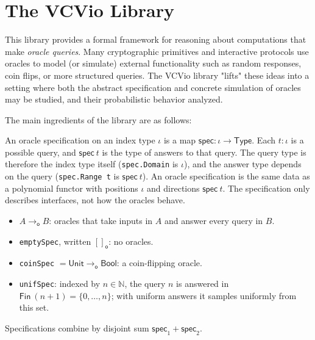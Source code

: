 \section{The VCVio Library}\label{sec:vcvio}

This library provides a formal framework for reasoning about computations that make \emph{oracle
queries}. Many cryptographic primitives and interactive protocols use oracles to model (or simulate)
external functionality such as random responses, coin flips, or more structured queries. The VCVio
library "lifts" these ideas into a setting where both the abstract specification and concrete
simulation of oracles may be studied, and their probabilistic behavior analyzed.

The main ingredients of the library are as follows:

\begin{definition}
    \label{def:oracle_spec}
    An oracle specification on an index type $\iota$ is a map $\mathsf{spec} : \iota \to \mathsf{Type}$.
    Each $t : \iota$ is a possible query, and $\mathsf{spec}\ t$ is the type of answers to that
    query. The query type is therefore the index type itself (\verb|spec.Domain| is $\iota$), and the
    answer type depends on the query (\verb|spec.Range t| is $\mathsf{spec}\ t$). An oracle
    specification is the same data as a polynomial functor with positions $\iota$ and directions
    $\mathsf{spec}\ t$. The specification only describes interfaces, not how the oracles behave.
    \leanok
\end{definition}

\begin{definition}
    \label{def:standard_oracle_specs}
    \begin{itemize}
        \item $A \to_{\mathsf{o}} B$: oracles that take inputs in $A$ and answer every query in $B$.
        \item \verb|emptySpec|, written $[]_{\mathsf{o}}$: no oracles.
        \item \verb|coinSpec| $= \mathsf{Unit} \to_{\mathsf{o}} \mathsf{Bool}$: a coin-flipping oracle.
        \item \verb|unifSpec|: indexed by $n \in \mathbb{N}$, the query $n$ is answered in
        $\mathsf{Fin}\ (n+1) = \{0, \ldots, n\}$; with uniform answers it samples uniformly from this set.
    \end{itemize}
    Specifications combine by disjoint sum $\mathsf{spec}_1 + \mathsf{spec}_2$.
    \leanok
\end{definition}

